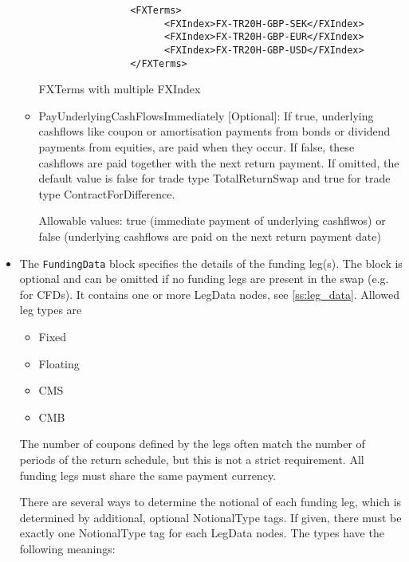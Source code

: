 \begin{itemize}
\begin{itemize}
    
        \begin{listing}[H]
\begin{verbatim}
                <FXTerms>
                      <FXIndex>FX-TR20H-GBP-SEK</FXIndex>
                      <FXIndex>FX-TR20H-GBP-EUR</FXIndex>
                      <FXIndex>FX-TR20H-GBP-USD</FXIndex>
                </FXTerms>
\end{verbatim}
\caption{FXTerms with multiple FXIndex}
\label{lst:fxterms}
\end{listing}

  \item PayUnderlyingCashFlowsImmediately [Optional]: If true, underlying cashflows like coupon or amortisation payments
    from bonds or dividend payments from equities, are paid when they occur. If false, these cashflows are paid together
    with the next return payment. If omitted, the default value is false for trade type TotalReturnSwap and true for
    trade type ContractForDifference.

  Allowable values: true (immediate payment of underlying cashflwos) or false (underlying cashflows are paid on the next
                    return payment date)

\end{itemize}

\item The {\tt FundingData} block specifies the details of the funding leg(s). The block is optional and can be omitted
  if no funding legs are present in the swap (e.g. for CFDs). It contains one or more LegData nodes, see
  \ref{ss:leg_data}. Allowed leg types are
  \begin{itemize}
  \item Fixed
  \item Floating
  \item CMS
  \item CMB
  \end{itemize}
  The number of coupons defined by the legs often match the number of periods of the return schedule, but this is not a
  strict requirement. All funding legs must share the same payment currency.

  There are several ways to determine the notional of each funding leg, which is determined by additional, optional
  NotionalType tags. If given, there must be exactly one NotionalType tag for each LegData nodes. The types have the
  following meanings:


\end{itemize}
